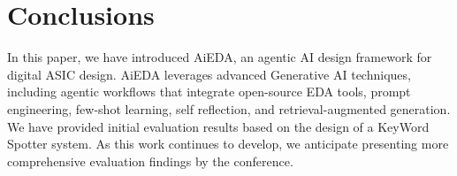 \section{Conclusions}
\label{sec:conclusions}
In this paper, we have introduced AiEDA, an agentic AI design framework for digital ASIC design. AiEDA leverages advanced Generative AI techniques, including agentic workflows that integrate open-source EDA tools, prompt engineering, few-shot learning, self reflection, and retrieval-augmented generation. We have provided initial evaluation results based on the design of a KeyWord Spotter system. As this work continues to develop, we anticipate presenting more comprehensive evaluation findings by the conference.